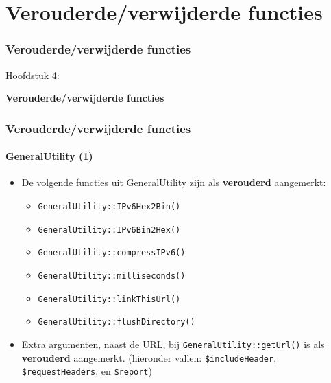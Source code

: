 %

\section{Verouderde/verwijderde functies}
\begin{frame}[fragile]
	\frametitle{Verouderde/verwijderde functies}

	\begin{center}\huge{Hoofdstuk 4:}\end{center}
	\begin{center}\huge{\color{typo3darkgrey}\textbf{Verouderde/verwijderde functies}}\end{center}

\end{frame}


\begin{frame}[fragile]
	\frametitle{Verouderde/verwijderde functies}
	\framesubtitle{GeneralUtility (1)}

	\begin{itemize}
		\item De volgende functies uit GeneralUtility zijn als \textbf{verouderd} aangemerkt:
			\begin{itemize}\smaller
				\item \texttt{GeneralUtility::IPv6Hex2Bin()}
				\item \texttt{GeneralUtility::IPv6Bin2Hex()}
				\item \texttt{GeneralUtility::compressIPv6()}
				\item \texttt{GeneralUtility::milliseconds()}
				\item \texttt{GeneralUtility::linkThisUrl()}
				\item \texttt{GeneralUtility::flushDirectory()}
			\end{itemize}\normalsize
			\vspace{0.4cm}

		\item Extra argumenten, naast de URL, bij \texttt{GeneralUtility::getUrl()}
			is als \textbf{verouderd} aangemerkt.\newline
			\smaller
				(hieronder vallen: \texttt{\$includeHeader}, \texttt{\$requestHeaders}, en \texttt{\$report})
			\normalsize

	\end{itemize}

\end{frame}

